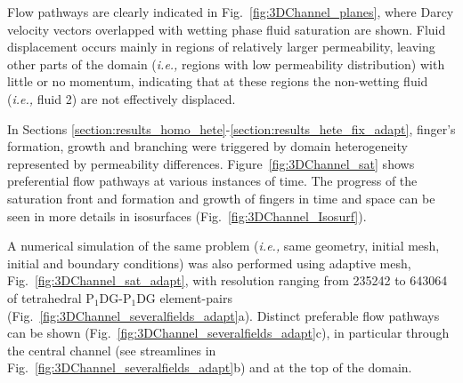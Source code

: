 \documentclass[preprint,authoryear,12pt]{elsarticle}
\newcommand{\PNDG}[2][error]{P$_{#1}$DG-P$_{#2}$DG}
\newcommand{\ie}{{\it i.e., }}
\begin{document}
\medskip
Flow pathways are clearly indicated in Fig.~\ref{fig:3DChannel_planes}, where Darcy velocity vectors overlapped with wetting phase fluid saturation are shown. Fluid displacement occurs mainly in regions of relatively larger permeability, leaving other parts of the domain (\ie regions with low permeability distribution) with little or no momentum, indicating that at these regions the non-wetting fluid (\ie fluid 2) are not effectively displaced. 
   
\medskip
In Sections \ref{section:results_homo_hete}-\ref{section:results_hete_fix_adapt}, finger's formation, growth and branching were triggered by domain heterogeneity represented by permeability differences. Figure~\ref{fig:3DChannel_sat} shows preferential flow pathways at various instances of time. The progress of the saturation front and formation and growth of fingers in time and space can be seen in more details in isosurfaces (Fig.~\ref{fig:3DChannel_Isosurf}).

\medskip
A numerical simulation of the same problem (\ie same geometry, initial mesh, initial and boundary conditions) was also performed using adaptive mesh, Fig.~\ref{fig:3DChannel_sat_adapt}, with resolution ranging from 235242 to 643064 of tetrahedral \PNDG[1]{1} element-pairs (Fig.~\ref{fig:3DChannel_severalfields_adapt}a). Distinct preferable flow pathways can be shown (Fig.~\ref{fig:3DChannel_severalfields_adapt}c), in particular through the central channel (see streamlines in Fig.~\ref{fig:3DChannel_severalfields_adapt}b) and at the top of the domain.
\end{document}
